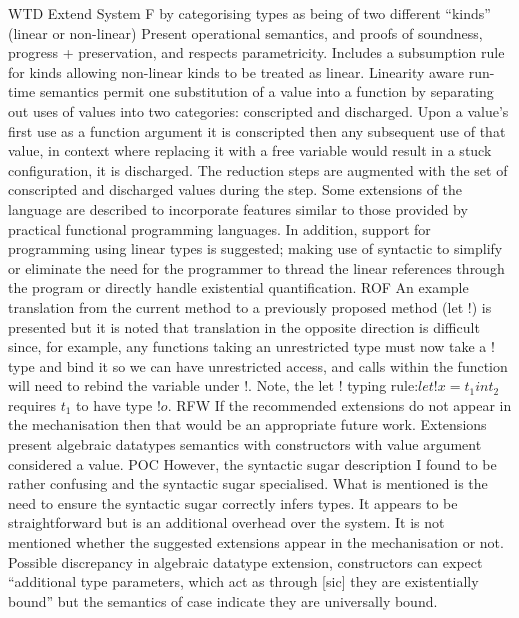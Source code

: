 \documentclass[11pt]{article}
\begin{document}
WTD
Extend System F by categorising types as being of two different ``kinds''
(linear or non-linear)
Present operational semantics, and proofs of soundness, progress +
preservation, and respects parametricity. Includes a subsumption rule for
kinds allowing non-linear kinds to be treated as linear.
Linearity aware run-time semantics permit one substitution of a value into
a function by separating out uses of values into two categories: conscripted
and discharged. Upon a value's first use as a function argument it is
conscripted then any subsequent use of that value, in context where replacing
it with a free variable would result in a stuck configuration, it is
discharged. The reduction steps are augmented with the set of conscripted
and discharged values during the step.
Some extensions of the language are described to incorporate features similar
to those provided by practical functional programming languages. In addition,
support for programming using linear types is suggested; making use of
syntactic to simplify or eliminate the need for the programmer to thread the
linear references through the program or directly handle existential
quantification.
ROF
An example translation from the current method to a previously proposed method
(let !) is presented but it is noted that translation in the opposite
direction is difficult since, for example, any functions taking an
unrestricted type must now take a ! type and bind it so we can have
unrestricted access, and calls within the function will need to rebind the
variable under !. Note, the let ! typing rule:$ let !x = t_1 in t_2$ requires
$t_1$ to have type $!o$.
RFW
If the recommended extensions do not appear in the mechanisation then that
would be an appropriate future work.
Extensions present algebraic datatypes semantics with constructors with
value argument considered a value.
POC
However, the syntactic sugar description I found to be rather confusing and
the syntactic sugar specialised. What is mentioned is the need to ensure
the syntactic sugar correctly infers types. It appears to be straightforward
but is an additional overhead over the system.
It is not mentioned whether the suggested extensions appear in the
mechanisation or not.
Possible discrepancy in algebraic datatype extension, constructors can expect
``additional type parameters, which act as through [sic] they are
existentially bound'' but the semantics of case indicate they are universally
bound.
\end{document}
